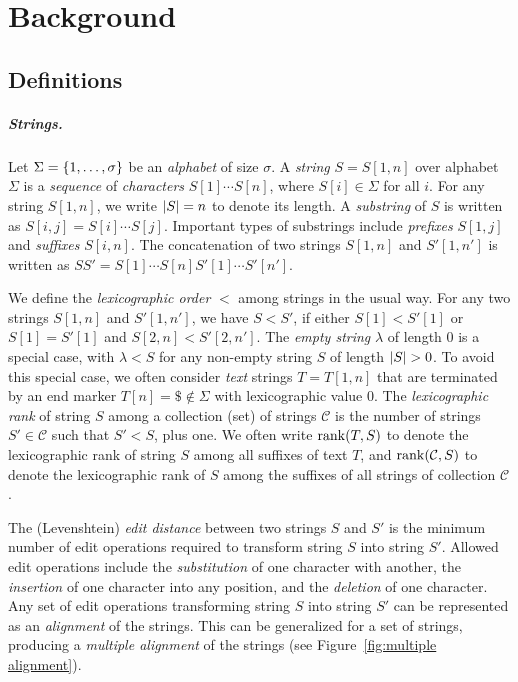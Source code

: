 \chapter{Background}\label{chapter:background}


\section{Definitions}

\paragraph{Strings.}

Let $\Sigma = \{ 1, \dotsc, \sigma \}$ be an \emph{alphabet} of size $\sigma$. A \emph{string} $S = S[1,n]$ over alphabet $\Sigma$ is a \emph{sequence} of \emph{characters} $S[1] \dotsm S[n]$, where $S[i] \in \Sigma$ for all $i$. For any string $S[1,n]$, we write $\lvert S \rvert = n$ to denote its length. A \emph{substring} of $S$ is written as $S[i,j] = S[i] \dotsm S[j]$. Important types of substrings include \emph{prefixes} $S[1,j]$ and \emph{suffixes} $S[i,n]$. The concatenation of two strings $S[1,n]$ and $S'[1,n']$ is written as $SS' = S[1] \dotsm S[n] S'[1] \dotsm S'[n']$.

We define the \emph{lexicographic order} $<$ among strings in the usual way. For any two strings $S[1,n]$ and $S'[1,n']$, we have $S < S'$, if either $S[1] < S'[1]$ or $S[1] = S'[1]$ and $S[2,n] < S'[2,n']$. The \emph{empty string} $\lambda$ of length $0$ is a special case, with $\lambda < S$ for any non-empty string $S$ of length $\lvert S \rvert > 0$. To avoid this special case, we often consider \emph{text} strings $T = T[1,n]$ that are terminated by an end marker $T[n] = \$ \not\in \Sigma$ with lexicographic value $0$. The \emph{lexicographic rank} of string $S$ among a collection (set) of strings $\mathcal{C}$ is the number of strings $S' \in \mathcal{C}$ such that $S' < S$, plus one. We often write $\operatorname{rank}(T, S)$ to denote the lexicographic rank of string $S$ among all suffixes of text $T$, and $\operatorname{rank}(\mathcal{C}, S)$ to denote the lexicographic rank of $S$ among the suffixes of all strings of collection $\mathcal{C}$.

The (Levenshtein) \emph{edit distance} between two strings $S$ and $S'$ is the minimum number of edit operations required to transform string $S$ into string $S'$. Allowed edit operations include the \emph{substitution} of one character with another, the \emph{insertion} of one character into any position, and the \emph{deletion} of one character. Any set of edit operations transforming string $S$ into string $S'$ can be represented as an \emph{alignment} of the strings. This can be generalized for a set of strings, producing a \emph{multiple alignment} of the strings (see Figure~\ref{fig:multiple alignment}).

